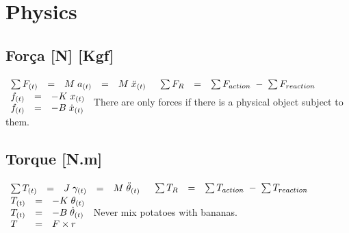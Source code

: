 \chapter{Physics}
\section*{Força  [N] [Kgf]}
\begin{minipage}[c]{\linewidth}
	\Large
	$\begin{array}{ l l l l l }
		\sum F_{(t)} & = & M \; a_{(t)} & = & M \; \ddot{x}_{(t)}
	\end{array}$
	\newline
	\newline
	$\begin{array}{ l l l }
		\sum F_{R} & = & \sum F_{action} \; - \; \sum F_{reaction}
	\end{array}$
	\newline
	\newline
	$\begin{array}{ l l l }
		f_{(t)} & = & -K \; x_{(t)} \\
		f_{(t)} & = & -B \; \dot{x}_{(t)}
	\end{array}$
	\newline
	\newline
	There are only forces if there is a physical object subject to them.
\end{minipage}
\newline
\section*{Torque [N.m]}
\begin{minipage}[c]{\linewidth}
	\Large
	$\begin{array}{ l l l l l }
		\sum T_{(t)} & = & J \; \gamma_{(t)} & = & M \; \ddot{\theta}_{(t)}
	\end{array}$
	\newline
	\newline
	$\begin{array}{ l l l }
		\sum T_{R} & = & \sum T_{action} \; - \; \sum T_{reaction}
	\end{array}$
	\newline
	\newline
	$\begin{array}{ l l l }
		T_{(t)} & = & -K \; \theta_{(t)} \\
		T_{(t)} & = & -B \; \dot{\theta}_{(t)} \\
		T & = & F \times r
	\end{array}$
	\newline
	\newline
	Never mix potatoes with bananas.
\end{minipage}
\newline
